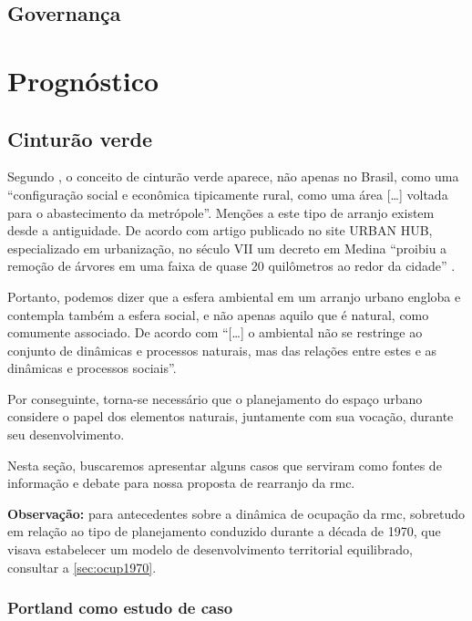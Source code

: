 	\section{Governança}
	
	\chapter{Prognóstico} \label{sec:prognostico}
	
	\section{Cinturão verde}
	
	Segundo , o conceito de cinturão verde aparece, não apenas no Brasil, como uma ``configuração social e econômica tipicamente rural, como uma área [\dots] voltada para o abastecimento da metrópole''. Menções a este tipo de arranjo existem desde a antiguidade. De acordo com artigo publicado no site URBAN HUB, especializado em urbanização, no século VII um decreto em Medina ``proibiu a remoção de árvores em uma faixa de quase 20 quilômetros ao redor da cidade'' \cite{urbanhub2017a}.
	
	Portanto, podemos dizer que a esfera ambiental em um arranjo urbano engloba e contempla também a esfera social, e não apenas aquilo que é natural, como comumente associado. De acordo com
	 ``[\dots] o ambiental não se restringe ao conjunto de dinâmicas e processos naturais, mas das relações entre estes e as dinâmicas e processos sociais''.
	
	Por conseguinte, torna-se necessário que o planejamento do espaço urbano considere o papel dos elementos naturais, juntamente com sua vocação, durante seu desenvolvimento.
	
	Nesta seção, buscaremos apresentar alguns casos que serviram como fontes de informação e debate para nossa proposta de rearranjo da \glsdesc{rmc}.
	
	\textbf{Observação:} para antecedentes sobre a dinâmica de ocupação da \glsdesc{rmc}, sobretudo em relação ao tipo de planejamento conduzido durante a década de 1970, que visava estabelecer um modelo de desenvolvimento territorial equilibrado, consultar a \autoref{sec:ocup1970}.
	
	\subsection{Portland como estudo de caso}
	
